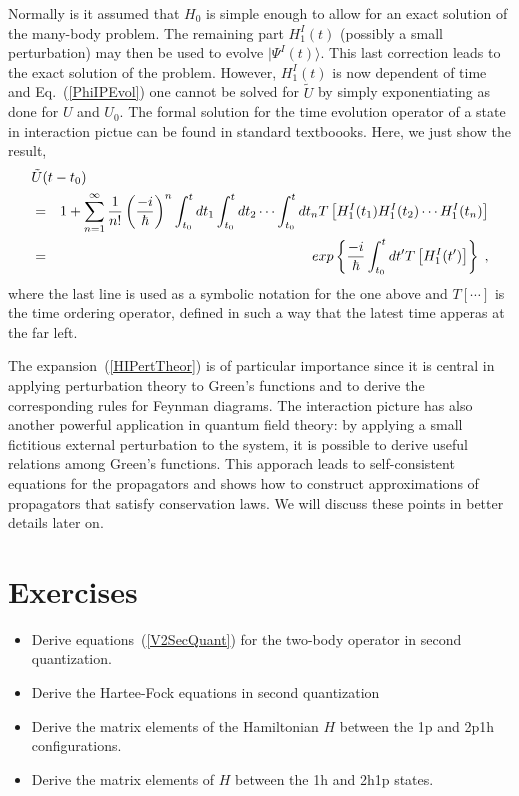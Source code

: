Normally is it assumed that $H_0$ is simple enough to allow for an exact solution of the many-body problem.  The remaining part $H^I_1(t)$ (possibly a small perturbation) may then be used to evolve  $\vert\Psi^I(t)\rangle$. This last correction leads to the exact solution of the problem. However, $H^I_1(t)$ is now dependent of time and Eq.~(\ref{PhiIPEvol}) one cannot be solved for $\tilde{U}$ by simply exponentiating as done for $U$ and $U_0$. 
 The formal solution for the time evolution operator of a state in interaction pictue can be found in standard textboooks. Here, we just show the result,
\begin{eqnarray}
\lefteqn{ \tilde{U}(t-t_0) } & &
\nonumber \\
&=& 1 + 
  \sum_{n=1}^\infty \frac{1}{n!} \left( \frac{-i}{\hbar}\right)^n
   \int^t_{t_0} d t_1 \int^t_{t_0} d t_2 \cdots \int^t_{t_0} d t_n 
      T \left[ H^I_1(t_1) H^I_1(t_2) \cdots H^I_1(t_n) \right]
\nonumber \\
&=&  exp \left\{\frac{-i}{\hbar} \int^t_{t_0} d t' T \left[ H^I_1(t')\right] \right\} \; ,
\label{HIPertTheor}
\end{eqnarray}
where the last line is used as a symbolic notation for the one above and $T[\cdots]$ is the time ordering operator, defined in such a way that the latest time apperas at the far left.

The expansion~(\ref{HIPertTheor}) is of particular importance since it is central in applying perturbation theory to  Green's functions and to derive the corresponding rules for Feynman diagrams.
The interaction picture has also another powerful application in quantum field theory: by applying a small fictitious external perturbation to the system, it is possible to derive useful relations among Green's functions. This apporach leads to self-consistent equations for the propagators and shows how to construct approximations of propagators that satisfy conservation laws.
 We will discuss these points in better details later on.




\section{Exercises}

\begin{itemize}
\item
Derive equations~(\ref{V2SecQuant}) for the two-body operator in second quantization.

\item
Derive the Hartee-Fock equations in second quantization

\item
Derive the matrix elements of the Hamiltonian $H$ between the 1p and 2p1h configurations. %

\item
Derive the matrix elements of $H$ between the 1h and 2h1p states.
\end{itemize}


